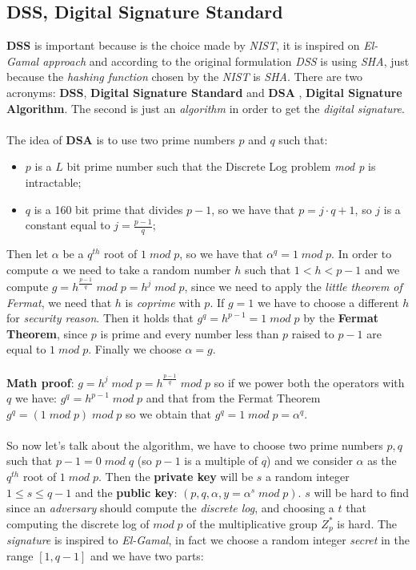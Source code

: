 \documentclass{article}
\begin{document}
\subsection{DSS, Digital Signature Standard}
\textbf{DSS} is important because is the choice made by \emph{NIST}, it is inspired on \emph{El-Gamal approach} and according to the original formulation \emph{DSS} is using \emph{SHA}, just because the \emph{hashing function} chosen by the \emph{NIST} is \emph{SHA}. There are two acronyms: \textbf{DSS}, \textbf{Digital Signature Standard} and \textbf{DSA} , \textbf{Digital Signature Algorithm}. The second is just an \emph{algorithm} in order to get the \emph{digital signature}. \\\\
The idea of \textbf{DSA} is to use two prime numbers $p$ and $q$ such that:
\begin{itemize}
\item $p$ is a $L$ bit prime number such that the Discrete Log problem \emph{mod p} is intractable;
\item $q$ is a 160 bit prime that divides $p-1$, so we have that $p = j \cdot q +1$, so $j$ is a constant equal to $j = \frac{p-1}{q}$; 
\end{itemize}
Then let $\alpha$ be a $q^{th}$ root of $1\; mod\; p$, so we have that $\alpha^q = 1\; mod\; p$. In order to compute $\alpha$ we need to take a random number $h$ such that $1< h < p-1$ and we compute $g=h^{\frac{p-1}{q}}\; mod\; p = h^j\; mod \; p$, since we need to apply the \emph{little theorem of Fermat}, we need that $h$ is \emph{coprime} with $p$. If $g=1$ we have to choose a different $h$ for \emph{security reason}. Then it holds that $g^q = h^{p-1} = 1\; mod\; p$ by the \textbf{Fermat Theorem}, since $p$ is prime and every number less than $p$ raised to $p-1$ are equal to $1\; mod\; p$. Finally we choose $\alpha = g$. \\\\ 
\textbf{Math proof}: $g= h^j\; mod\; p = h^{\frac{p-1}{q}}  \; mod\; p$ so if we power both the operators with $q$ we have: $g^q = h^{p-1} \; mod\; p$ and that from the Fermat Theorem $g^q = (1 \; mod\; p) \; mod\; p$ so we obtain that $g^q = 1 \; mod\; p = \alpha^q$. \\\\
So now let's talk about the algorithm, we have to choose two prime numbers $p,q$ such that $p-1 = 0\; mod\; q$ (so $p-1$ is a multiple of $q$) and we consider $\alpha$ as the $q^{th}$ root of $1\; mod\; p$. Then the \textbf{private key} will be $s$ a random integer $1 \leq s \leq q-1$ and the \textbf{public key}: $(p,q,\alpha,y = \alpha^s \; mod \; p)$. $s$ will be hard to find since an \emph{adversary} should compute the \emph{discrete log}, and choosing a $t$ that computing the discrete log of $mod\; p$ of the multiplicative group $Z_p^{*}$ is hard. The \emph{signature} is inspired to \emph{El-Gamal}, in fact we choose a random integer \emph{secret} in the range $\left[1,q-1 \right]$ and we have two parts:
\end{document}
